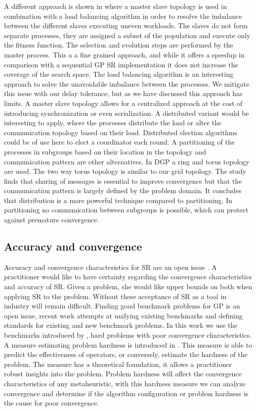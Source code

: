 A different approach is shown in \citep{DFGPSR} where a master slave topology is used in combination with a load balancing algorithm in order to resolve the imbalance between the different slaves executing uneven workloads. The slaves do not form separate processes, they are assigned a subset of the population and execute only the fitness function. The selection and evolution steps are performed by the master process. This a a fine grained approach, and while it offers a speedup in comparison with a sequential GP SR implementation it does not increase the coverage of the search space. The load balancing algorithm is an interesting approach to solve the unavoidable imbalance between the processes. We mitigate this issue with our delay tolerance, but as we have discussed this approach has limits. A master slave topology allows for a centralized approach at the cost of introducing synchronization or even serialization. A distributed variant would be interesting to apply, where the processes distribute the load or alter the communication topology based on their load. Distributed election algorithms could be of use here to elect a coordinator each round. A partitioning of the processes in subgroups based on their location in the topology and communication pattern are other alternatives.
In DGP \cite{DGP} a ring and torus topology are used. The two way torus topology is similar to our grid topology. The study finds that sharing of messages is essential to improve convergence but that the communication pattern is largely defined by the problem domain. It concludes that distribution is a more powerful technique compared to partitioning. In partitioning no communication between subgroups is possible, which can protect against premature convergence.

\subsection{Accuracy and convergence}
Accuracy and convergence characteristics for SR are an open issue \citep{SRAccuracy, SRAccur, SRBaseline}. A practitioner would like to have certainty regarding the convergence characteristics and accuracy of SR. Given a problem, she would like upper bounds on both when applying SR to the problem. Without these acceptance of SR as a tool in industry will remain difficult.
Finding good benchmark problems for GP is an open issue, recent work \citep{GPBenchmarks} attempts at unifying existing benchmarks and defining standards for existing and new benchmark problems. In this work we use the benchmarks introduced by \cite{SRAccuracy}, hard problems with poor convergence characteristics.
A measure estimating problem hardness is introduced in \citep{GPHardness}. This measure is able to predict the effectiveness of operators, or conversely, estimate the hardness of the problem. The measure has a theoretical foundation, it allows a practitioner robust insights into the problem. Problem hardness will affect the convergence characteristics of any metaheuristic, with this hardness measure we can analyze convergence and determine if the algorithm configuration or problem hardness is the cause for poor convergence.
